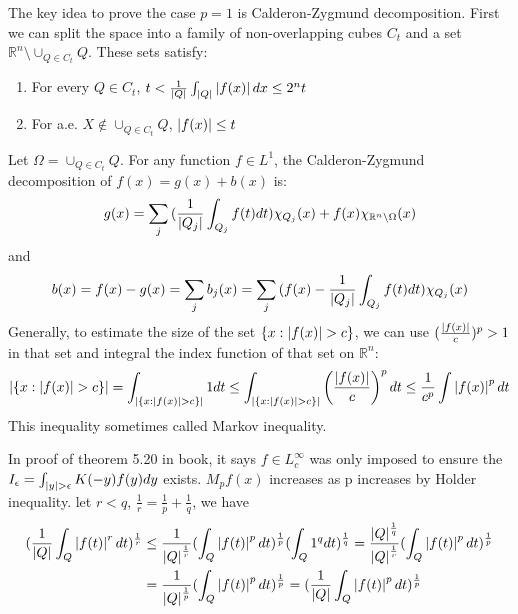\begin{remark}[notes on proof of inequality \eqref{ieq: case p=1}]
    The key idea to prove the case $p=1$ is Calderon-Zygmund decomposition. First we can split the space into a family of non-overlapping cubes $C_t$ and a set $\mathbb{R}^n\setminus\cup_{Q\in C_t}Q$. These sets satisfy:
    \begin{enumerate}
        \item For every $Q\in C_t$, $t<\frac{1}{\left\lvert Q\right\rvert}\int_{\left\lvert Q\right\rvert}{\left\lvert f(x)\right\rvert dx}\leq 2^nt$
        \item For a.e. $X\notin \cup_{Q\in C_t}Q$, $\left\lvert f(x)\right\rvert\leq t$
    \end{enumerate}
    Let $\Omega=\cup_{Q\in C_t}Q$.  For any function $f\in L^1$, the Calderon-Zygmund decomposition of $f(x)=g(x)+b(x)$ is:
    \begin{equation*}
        g(x)=\sum_j{(\frac{1}{\left\lvert Q_j\right\rvert}\int_{Q_j}{f(t)dt})\chi_{Q_j}(x)+f(x)\chi_{\mathbb{R}^n\setminus\Omega}(x)}
    \end{equation*}
    and
    \begin{equation*}
        b(x)=f(x)-g(x)=\sum_jb_j(x)=\sum_j{(f(x)-\frac{1}{\left\lvert Q_j\right\rvert}\int_{Q_j}f(t)d t)}\chi_{Q_j}(x)
    \end{equation*}
    Generally, to estimate the size of the set $\{x:\left\lvert f(x)\right\rvert>c\}$, we can use $(\frac{\left\lvert f(x)\right\rvert}{c})^p>1$ in that set and integral the index function of that set on $\mathbb{R}^n$:
    \begin{equation*}
        \left\lvert\{x:\left\lvert f(x)\right\rvert>c\}\right\rvert=\int_{\left\lvert\{x:\left\lvert f(x)\right\rvert>c\}\right\rvert}1dt\leq\int_{\left\lvert\{x:\left\lvert f(x)\right\rvert>c\}\right\rvert}\left(\frac{\left\lvert f(x)\right\rvert}{c}\right)^p d t\leq\frac{1}{c^p}\int\left\lvert f(x)\right\rvert^p d t
    \end{equation*}
    This inequality sometimes called Markov inequality.
\end{remark}
\begin{remark}
    {\color{blue}In proof of theorem 5.20 in book, it says $f\in L^\infty_c$ was only imposed to ensure the $I_\epsilon=\int_{\left\lvert y\right\rvert>\epsilon}{K(-y)f(y)dy}$ exists}.
    $M_pf(x)$ increases as p increases by Holder inequality. let $r<q$, $\frac{1}{r}=\frac{1}{p}+\frac{1}{q}$, we have
    \begin{align*}
        (\frac{1}{\left\lvert Q\right\rvert}\int_{Q}\left\lvert f(t)\right\rvert^r d t)^\frac{1}{r} & \leq \frac{1}{\left\lvert Q\right\rvert^\frac{1}{r}}(\int_{Q}\left\lvert f(t)\right\rvert^p d t)^\frac{1}{p} (\int_{Q}1^q d t)^\frac{1}{q}=\frac{\left\lvert Q\right\rvert^\frac{1}{q}}{\left\lvert Q\right\rvert^\frac{1}{r}}(\int_{Q}\left\lvert f(t)\right\rvert^p d t)^\frac{1}{p} \\
                                                                & =\frac{1}{\left\lvert Q\right\rvert^\frac{1}{p}}(\int_{Q}\left\lvert f(t)\right\rvert^p d t)^\frac{1}{p}=(\frac{1}{\left\lvert Q\right\rvert}\int_{Q}\left\lvert f(t)\right\rvert^p d t)^\frac{1}{p}
    \end{align*}

\end{remark}
